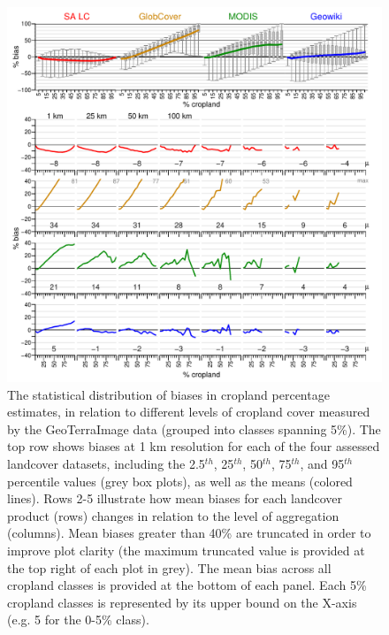 \documentclass[11 pt]{article}
\begin{document}
\begin{figure}[H]
\begin{center}
\includegraphics[width = \linewidth]{../figures/bias_act.pdf}
\caption{The statistical distribution of biases in cropland percentage estimates, in relation to different levels of cropland cover measured by the GeoTerraImage data (grouped into classes spanning 5\%). The top row shows biases at 1 km resolution for each of the four assessed landcover datasets, including the 2.5$^{th}$, 25$^{th}$, 50$^{th}$, 75$^{th}$, and 95$^{th}$ percentile values (grey box plots), as well as the means (colored lines). Rows 2-5 illustrate how mean biases for each landcover product (rows) changes in relation to the level of aggregation (columns). Mean biases greater than 40\% are truncated in order to improve plot clarity (the maximum truncated value is provided at the top right of each plot in grey). The mean bias across all cropland classes is provided at the bottom of each panel. Each 5\% cropland classes is represented by its upper bound on the X-axis (e.g. 5 for the 0-5\% class).}
\end{center}
\end{figure}
\end{document}

